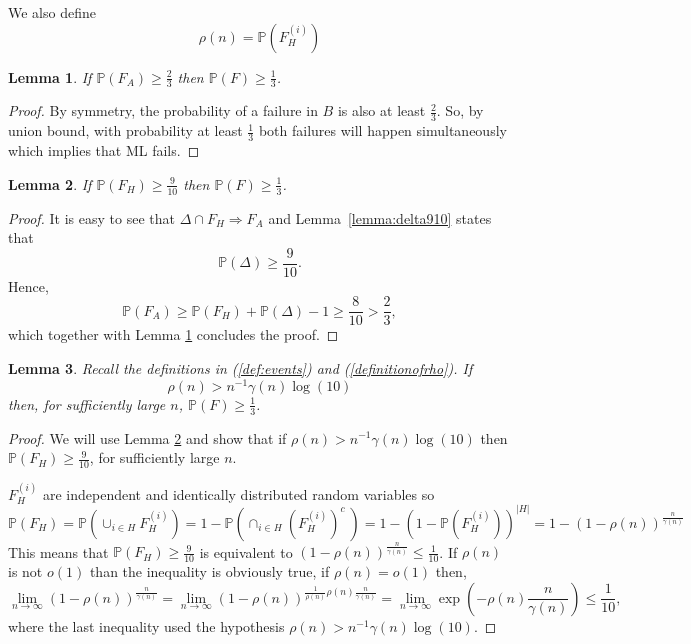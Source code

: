 \documentclass[english]{article}
\newtheorem{lemma}{Lemma}
\newcommand{\1}{\textbf{1}}
\newcommand{\p}{\mathbb{P}}
\begin{document}
We also define
\begin{equation}\label{definitionofrho}
\rho(n) = \p\left( F_H^{(i)} \right)
\end{equation}

\begin{lemma}\label{lemma_FAF}
If $\p\left(F_A\right)\geq \frac23$ then $\p\left( F \right)\geq \frac13$.
\end{lemma}
\begin{proof}
By symmetry, the probability of a failure in $B$ is also at least $\frac23$. So, by union bound, with probability at least $\frac13$ both failures will happen simultaneously which implies that ML fails.
\end{proof}




\begin{lemma}\label{lemma:reverseunionboundH}
If $\p\left( F_H\right) \geq \frac9{10}$ then $\p\left( F \right)\geq \frac13$.
\end{lemma}
\begin{proof}
It is easy to see that $\Delta \cap F_H \Rightarrow F_A$ and
Lemma~\ref{lemma:delta910} states that
\begin{equation}
\p\left( \Delta\right) \geq \frac9{10}.
\end{equation}
Hence,
\[
\p\left(F_A\right) \geq \p\left(F_H\right) + \p\left(\Delta\right) - 1 \geq \frac8{10} > \frac23,
\]
which together with Lemma \ref{lemma_FAF} concludes the proof.
\end{proof}

\begin{lemma}\label{lemma:controlrhoisenough}
Recall the definitions in (\ref{def:events}) and (\ref{definitionofrho}). If $$\rho(n) > n^{-1}\gamma(n)\log(10)$$ then, for sufficiently large $n$, $\p\left( F \right)\geq \frac13$.
\end{lemma}

\begin{proof} We will use Lemma \ref{lemma:reverseunionboundH} and show that if $\rho(n) > n^{-1}\gamma(n)\log(10)$ then $\p\left( F_H\right) \geq \frac9{10}$, for sufficiently large $n$.

$F_H^{(i)}$ are independent and identically distributed random variables so
\[
\p\left(F_H\right) = \p\left(\cup_{i\in H} F_H^{(i)}\right) = 1-\p\left(\cap_{i\in H} \left(F_H^{(i)}\right)^c\ \right) = 1-\left( 1 - \p\left(F_H^{(i)}\right) \right)^{|H|} = 1-\left( 1 - \rho(n) \right)^{\frac{n}{\gamma(n)}}
\]
This means that $\p\left( F_H\right) \geq \frac9{10}$ is equivalent to $\left( 1 - \rho(n) \right)^{\frac{n}{\gamma(n)}} \leq \frac1{10}$. If $\rho(n)$ is not $o(1)$ than the inequality is obviously true, if $\rho(n) = o(1)$ then,
\[
\lim_{n\to\infty} \left( 1 - \rho(n) \right)^{\frac{n}{\gamma(n)}} = \lim_{n\to\infty}\left( 1 - \rho(n) \right)^{\frac1{\rho(n)}\rho(n)\frac{n}{\gamma(n)}} = \lim_{n\to\infty}\exp\left( - \rho(n)\frac{n}{\gamma(n)} \right) \leq \frac1{10},
\]
where the last inequality used the hypothesis $\rho(n) > n^{-1}\gamma(n)\log(10)$.
\end{proof}
\end{document}
